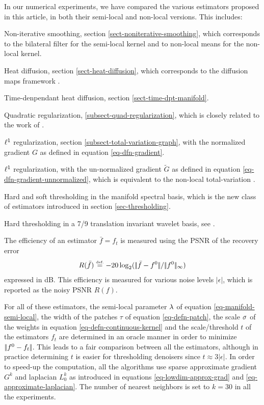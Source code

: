 \documentclass[final]{siamltex}
\newcommand{\F}{f}
\newcommand{\fz}{f^0}
\begin{document}
In our numerical experiments, we have compared the various estimators proposed in this article, in both their semi-local and non-local versions. This includes:
\begin{rs}
	\item Non-iterative smoothing, section \ref{sect-noniterative-smoothing}, which corresponds to the bilateral filter \cite{tomasi-bilateral} for the semi-local kernel and to non-local means \cite{buades-nl-means} for the non-local kernel. 
	\item Heat diffusion, section \ref{sect-heat-diffusion}, which corresponds to the diffusion maps framework \cite{szlam-regularization}.
	\item Time-denpendant heat diffusion, section \ref{sect-time-dpt-manifold}.
	\item Quadratic regularization, \ref{subsect-quad-regularization}, which is closely related to the work of \cite{gilboa-nonlocal-segmentation}.
	\item $\ell^1$ regularization, section \ref{subsect-total-variation-graph}, with the normalized gradient $G$ as defined in equation \eqref{eq-dfn-gradient}.
	\item $\ell^1$ regularization, with the un-normalized gradient $\tilde G$ as defined in equation \eqref{eq-dfn-gradient-unnormalized}, which is equivalent to the non-local total-variation \cite{gilboa-nonlocal-functionals}.
	\item Hard and soft thresholding in the manifold spectral basis, which is the new class of estimators introduced in section \ref{sec-thresholding}.
	\item Hard thresholding in a 7/9 translation invariant wavelet basis, see \cite{mallat-book}.
\end{rs}
The efficiency of an estimator $\bar f = \F_t$ is measured using the PSNR of the recovery error 
\begin{equation*}
	R(\bar f) \eqdef -20\log_2( \norm{\bar f -\fz}/\norm{\fz}_{\infty} )
\end{equation*}
expressed in dB. This efficiency is measured for various noise levels $|\epsilon|$, which is reported as the noisy PSNR $R(\F)$.

For all of these estimators, the semi-local parameter $\lambda$ of equation \eqref{eq-manifold-semi-local}, the width of the patches $\tau$ of equation \eqref{eq-defn-patch}, the scale $\sigma$ of the weights in equation \eqref{eq-defn-continuous-kernel} and the scale/threshold $t$ of the estimators $\F_t$ are determined in an oracle manner in order to minimize $\norm{\fz-\F_t}$. This leads to a fair comparison between all the estimators, although in practice determining $t$ is easier for thresholding denoisers since $t \approx 3 |\epsilon|$. In order to speed-up the computation, all the algorithms use sparse approximate gradient $G^k$ and laplacian $L_0^k$ as introduced in equations \eqref{eq-lowdim-approx-grad} and \eqref{eq-approximate-laplacian}. The number of nearest neighbors is set to $k=30$ in all the experiments.
\end{document}
